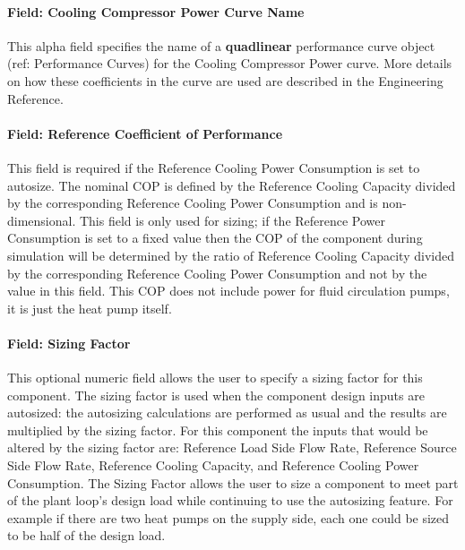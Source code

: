 \paragraph{Field: Cooling Compressor Power Curve Name}\label{field-cooling-compressor-power-curve-name}

This alpha field specifies the name of a \textbf{quadlinear} performance curve object (ref: Performance Curves) for the Cooling Compressor Power curve. More details on how these coefficients in the curve are used are described in the Engineering Reference.

\paragraph{Field: Reference Coefficient of Performance}\label{field-cooling-nom-COP}

This field is required if the Reference Cooling Power Consumption is set to autosize. The nominal COP is defined by the Reference Cooling Capacity divided by the corresponding Reference Cooling Power Consumption and is non-dimensional. This field is only used for sizing; if the Reference Power Consumption is set to a fixed value then the COP of the component during simulation will be determined by the ratio of Reference Cooling Capacity divided by the corresponding Reference Cooling Power Consumption and not by the value in this field. This COP does not include power for fluid circulation pumps, it is just the heat pump itself.

\paragraph{Field: Sizing Factor}\label{field-cooling-siz-fac}

This optional numeric field allows the user to specify a sizing factor for this component. The
sizing factor is used when the component design inputs are autosized: the autosizing calculations
are performed as usual and the results are multiplied by the sizing factor. For this component
the inputs that would be altered by the sizing factor are: Reference Load Side Flow Rate, Reference Source Side Flow Rate, Reference Cooling Capacity, and Reference Cooling Power Consumption. The Sizing Factor allows the user to size
a component to meet part of the plant loop's design load while continuing to use the autosizing feature. For example if there are two heat pumps on the supply side, each one could be sized to be half of the design load.

